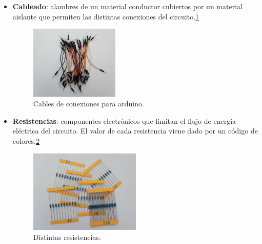 \begin{itemize}
\item \textbf{Cableado}: alambres de un material conductor cubiertos por un material aislante que permiten las distintas conexiones del circuito.\ref{fig:cableado}
\begin{figure}[h!]
    \centering
    \includegraphics[width=0.4\textwidth]{img/imgCableado.jpg}
    \caption{Cables de conexiones para arduino.}
    \label{fig:cableado} %
\end{figure}

\item \textbf{Resistencias}: componentes electrónicos que limitan el flujo de energía eléctrica del circuito. El valor de cada resistencia viene dado por un código de colores.\ref{fig:resistencias}
\begin{figure}[h!]
    \centering
    \includegraphics[width=0.5\textwidth]{img/imgResistencias.jpg}
    \caption{Distintas resistencias.}
    \label{fig:resistencias} %
\end{figure}


\end{itemize}
